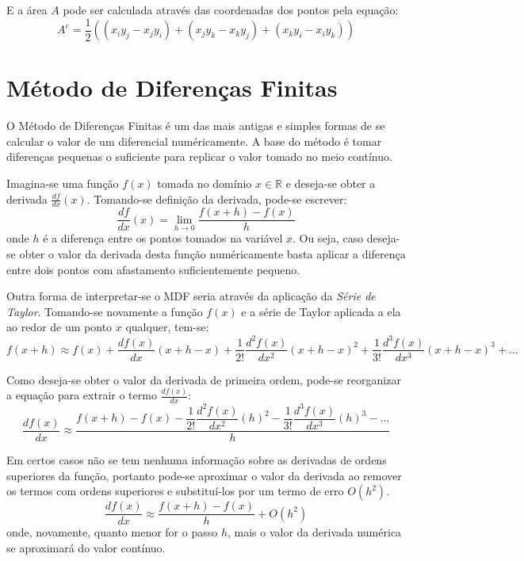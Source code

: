 E a área $A$ pode ser calculada através das coordenadas dos pontos pela equação:
\begin{equation}
    A^e = \dfrac{1}{2} (
        (x_i y_j - x_j y_i) +
        (x_j y_k - x_k y_j) +
        (x_k y_i - x_i y_k)
    )
\end{equation}


\section{\textbf{Método de Diferenças Finitas}}
\label{mdf}
O Método de Diferenças Finitas é um das mais antigas e simples formas de se calcular o valor de um diferencial numéricamente.
A base do método é tomar diferenças pequenas o suficiente para replicar o valor tomado no meio contínuo.

Imagina-se uma função $f(x)$ tomada no domínio $x \in \mathbb{R}$ e deseja-se obter a derivada $\tfrac{df}{dx}(x)$.
Tomando-se definição da derivada, pode-se escrever:
\begin{equation}
    \dfrac{df}{dx}(x) = \lim_{h\to0} \dfrac{f(x+h)-f(x)}{h}
    \label{derivative}
\end{equation}
onde $h$ é a diferença entre os pontos tomados na variável $x$.
Ou seja, caso deseja-se obter o valor da derivada desta função numéricamente basta aplicar a diferença entre dois pontos com afastamento suficientemente pequeno.

Outra forma de interpretar-se o MDF seria através da aplicação da \textit{Série de Taylor}.
Tomando-se novamente a função $f(x)$ e a série de Taylor aplicada a ela ao redor de um ponto $x$ qualquer, tem-se:
\begin{equation}
    f(x + h) \approx
    f(x) +
    \dfrac{df(x)}{dx}(x + h - x) +
    \dfrac{1}{2!}\dfrac{d^2f(x)}{dx^2}(x + h - x)^2 +
    \dfrac{1}{3!}\dfrac{d^3f(x)}{dx^3}(x + h - x)^3 +
    \ldots
\end{equation}

Como deseja-se obter o valor da derivada de primeira ordem, pode-se reorganizar a equação para extrair o termo $\tfrac{df(x)}{dx}$:
\begin{equation}
    \dfrac{df(x)}{dx} \approx
    \frac{
        f(x + h) -
        f(x) -
        \dfrac{1}{2!}\dfrac{d^2f(x)}{dx^2}(h)^2 -
        \dfrac{1}{3!}\dfrac{d^3f(x)}{dx^3}(h)^3 -
        \ldots
    }{h}
\end{equation}

Em certos casos não se tem nenhuma informação sobre as derivadas de ordens superiores da função, portanto pode-se aproximar o valor da derivada ao remover os termos com ordens superiores e substituí-los por um termo de erro $O(h^2)$.
\begin{equation}
    \dfrac{df(x)}{dx} \approx
    \frac{
        f(x + h) -
        f(x)
    }{h} +
    O(h^2)
    \label{dif}
\end{equation}
onde, novamente, quanto menor for o passo $h$, mais o valor da derivada numérica se aproximará do valor contínuo.


